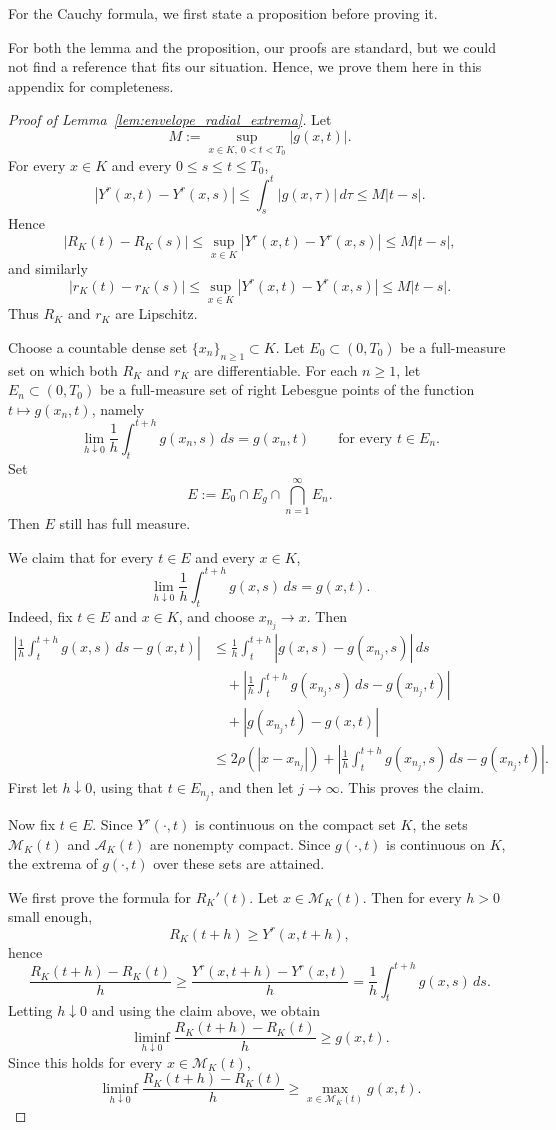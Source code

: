 \documentclass[reqno,11pt]{amsart}
\begin{document}
For the Cauchy formula, we first state a proposition before proving it. 

For both the lemma and the proposition, our proofs are standard, but we could not find a reference that fits our situation. Hence, we prove them here in this appendix for completeness.

\begin{proof}[Proof of Lemma~\ref{lem:envelope_radial_extrema}]
Let
\[
M:=\sup_{x\in K, \ 0<t<T_0}|g(x,t)|.
\]
For every $x\in K$ and every $0\le s\le t\le T_0$,
\[
|Y^r(x,t)-Y^r(x,s)|
\le \int_s^t |g(x,\tau)|\,d\tau
\le M|t-s|.
\]
Hence
\[
|R_K(t)-R_K(s)|
\le \sup_{x\in K}|Y^r(x,t)-Y^r(x,s)|
\le M|t-s|,
\]
and similarly
\[
|r_K(t)-r_K(s)|
\le \sup_{x\in K}|Y^r(x,t)-Y^r(x,s)|
\le M|t-s|.
\]
Thus $R_K$ and $r_K$ are Lipschitz.

Choose a countable dense set $\{x_n\}_{n\ge 1}\subset K$. Let $E_0\subset (0,T_0)$ be a
full-measure set on which both $R_K$ and $r_K$ are differentiable. For each $n\ge 1$,
let $E_n\subset (0,T_0)$ be a full-measure set of right Lebesgue points of the function
$t\mapsto g(x_n,t)$, namely
\[
\lim_{h\downarrow 0}\frac{1}{h}\int_t^{t+h} g(x_n,s)\,ds = g(x_n,t)
\qquad
\text{for every }t\in E_n.
\]
Set
\[
E:=E_0\cap E_g \cap \bigcap_{n=1}^\infty E_n.
\]
Then $E$ still has full measure.

We claim that for every $t\in E$ and every $x\in K$,
\[
\lim_{h\downarrow 0}\frac{1}{h}\int_t^{t+h} g(x,s)\,ds = g(x,t).
\]
Indeed, fix $t\in E$ and $x\in K$, and choose $x_{n_j}\to x$. Then
\[
\begin{aligned}
\left|
\frac{1}{h}\int_t^{t+h} g(x,s)\,ds - g(x,t)
\right|
&\le
\frac{1}{h}\int_t^{t+h}|g(x,s)-g(x_{n_j},s)|\,ds \\
&\quad +
\left|
\frac{1}{h}\int_t^{t+h} g(x_{n_j},s)\,ds - g(x_{n_j},t)
\right| \\
&\quad + |g(x_{n_j},t)-g(x,t)| \\
&\le
2\rho(|x-x_{n_j}|) +
\left|
\frac{1}{h}\int_t^{t+h} g(x_{n_j},s)\,ds - g(x_{n_j},t)
\right|.
\end{aligned}
\]
First let $h\downarrow 0$, using that $t\in E_{n_j}$, and then let $j\to\infty$. This proves
the claim.

Now fix $t\in E$. Since $Y^r(\cdot,t)$ is continuous on the compact set $K$, the sets
$\mathcal M_K(t)$ and $\mathcal A_K(t)$ are nonempty compact. Since $g(\cdot,t)$ is
continuous on $K$, the extrema of $g(\cdot,t)$ over these sets are attained.

We first prove the formula for $R_K'(t)$. Let $x\in \mathcal M_K(t)$. Then for every $h>0$
small enough,
\[
R_K(t+h)\ge Y^r(x,t+h),
\]
hence
\[
\frac{R_K(t+h)-R_K(t)}{h}
\ge
\frac{Y^r(x,t+h)-Y^r(x,t)}{h}
=
\frac{1}{h}\int_t^{t+h} g(x,s)\,ds.
\]
Letting $h\downarrow 0$ and using the claim above, we obtain
\[
\liminf_{h\downarrow 0}\frac{R_K(t+h)-R_K(t)}{h}\ge g(x,t).
\]
Since this holds for every $x\in \mathcal M_K(t)$,
\[
\liminf_{h\downarrow 0}\frac{R_K(t+h)-R_K(t)}{h}
\ge
\max_{x\in \mathcal M_K(t)} g(x,t).
\]


\end{proof}
\end{document}

